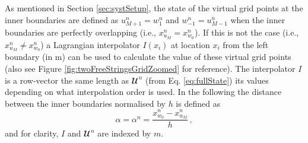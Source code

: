 As mentioned in Section \ref{sec:systSetup}, the state of the virtual grid points at the inner boundaries are defined as $u_{M+1}^n = w_1^n$ and $w_{-1}^n = u_{M-1}^n$ when the inner boundaries are perfectly overlapping  (i.e., $x^n_{u_M} = x^n_{w_0}$). If this is not the case (i.e., $x^n_{u_M} \neq x^n_{w_0}$) a Lagrangian interpolator $I(x_i)$ at location $x_i$ from the left boundary (in m) can be used to calculate the value of these virtual grid points (also see Figure \ref{fig:twoFreeStringsGridZoomed} for reference). The interpolator $I$ is a row-vector the same length as $\mathbfcal{U}^n$ (from Eq. \eqref{eq:fullState}) its values depending on what interpolation order is used. In the following the distance between the inner boundaries normalised by $h$ is defined as 
\begin{equation}\label{eq:alphaDef}
    \alpha = \alpha^n = \frac{x^n_{w_0} - x^n_{u_M}}{h}\,,
\end{equation}
and for clarity, $I$ and $\mathbfcal{U}^n$ are indexed by $m$.
